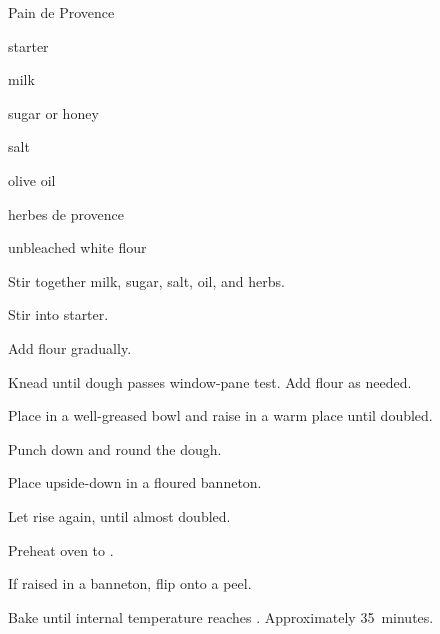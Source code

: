 \begin{recipe}{Pain de Provence}{}{}

\begin{ingredients}
\item {} starter
\item \C{\half} milk
\item {} sugar or honey
\item {} salt
\item {} olive oil
\item {} herbes de provence
\item {} unbleached white flour
\end{ingredients}

\begin{directions}
\item Stir together milk, sugar, salt, oil, and herbs.
\item Stir into starter.
\item Add flour gradually.
\item Knead until dough passes window-pane test. Add flour as needed.
\item Place in a well-greased bowl and raise in a warm place until doubled.
\item Punch down and round the dough.
\item Place upside-down in a floured banneton.
\item Let rise again, until almost doubled.
\item Preheat oven to .
\item If raised in a banneton, flip onto a peel.
\item Bake until internal temperature reaches . Approximately 35~minutes.
\end{directions}

\end{recipe}
